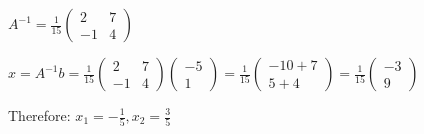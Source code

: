 \documentclass[12pt]{article}
\begin{document}
$A^{-1} = \frac{1}{15}\begin{pmatrix}
	2 & 7 \\
	-1 & 4
\end{pmatrix}$

$x = A^{-1}b = \frac{1}{15}\begin{pmatrix}
	2 & 7 \\
	-1 & 4
\end{pmatrix}\begin{pmatrix}
	-5 \\
	1
\end{pmatrix} = \frac{1}{15}\begin{pmatrix}
	-10 + 7 \\
	5 + 4
\end{pmatrix} = \frac{1}{15}\begin{pmatrix}
	-3 \\
	9
\end{pmatrix}$

Therefore: $x_1 = -\frac{1}{5}, x_2 = \frac{3}{5}$
\end{document}
